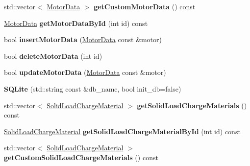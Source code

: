 \begin{DoxyCompactItemize}
\mbox{\label{class_s_q_lite_a0cc4f6952652d05d6a87e2f7cc232d57}} 
std\+::vector$<$ \hyperlink{class_motor_data}{Motor\+Data} $>$ {\bfseries get\+Custom\+Motor\+Data} () const
\item 
\mbox{\label{class_s_q_lite_a4b0a99992e2909216b40dc499c86a028}} 
\hyperlink{class_motor_data}{Motor\+Data} {\bfseries get\+Motor\+Data\+By\+Id} (int id) const
\item 
\mbox{\label{class_s_q_lite_a38eb0f1501e0918c267a9ab3a0953a54}} 
bool {\bfseries insert\+Motor\+Data} (\hyperlink{class_motor_data}{Motor\+Data} const \&motor)
\item 
\mbox{\label{class_s_q_lite_ab1f59cd24e3931970bc39079b0a5e612}} 
bool {\bfseries delete\+Motor\+Data} (int id)
\item 
\mbox{\label{class_s_q_lite_a7909128eed1b0612ecdf7c50edf1426a}} 
bool {\bfseries update\+Motor\+Data} (\hyperlink{class_motor_data}{Motor\+Data} const \&motor)
\item 
\mbox{\label{class_s_q_lite_a758f334ed7e72820f4f0e83d2b707625}} 
{\bfseries S\+Q\+Lite} (std\+::string const \&db\+\_\+name, bool init\+\_\+db=false)
\item 
\mbox{\label{class_s_q_lite_af6195f55e9658c24a8f14b884e490acb}} 
std\+::vector$<$ \hyperlink{class_solid_load_charge_material}{Solid\+Load\+Charge\+Material} $>$ {\bfseries get\+Solid\+Load\+Charge\+Materials} () const
\item 
\mbox{\label{class_s_q_lite_ab2a00b913321a96a4d7b700627195616}} 
\hyperlink{class_solid_load_charge_material}{Solid\+Load\+Charge\+Material} {\bfseries get\+Solid\+Load\+Charge\+Material\+By\+Id} (int id) const
\item 
\mbox{\label{class_s_q_lite_a868c571d80d43a991762ec20c168ebb2}} 
std\+::vector$<$ \hyperlink{class_solid_load_charge_material}{Solid\+Load\+Charge\+Material} $>$ {\bfseries get\+Custom\+Solid\+Load\+Charge\+Materials} () const
\item 
\mbox{\label{class_s_q_lite_a5c40ac3b9a6abb85c9cfbe50802672c5}} 

\end{DoxyCompactItemize}
